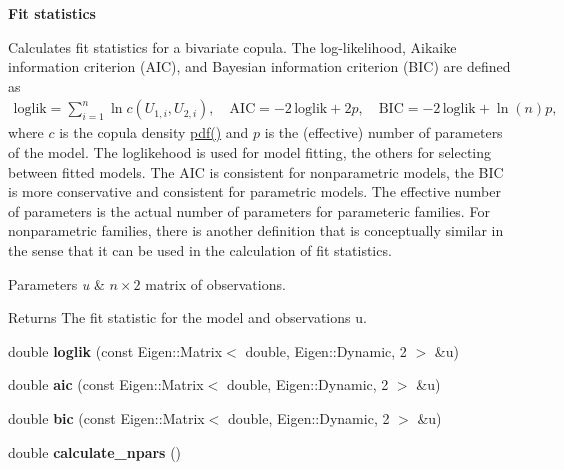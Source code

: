 \begin{Indent}{\bf Fit statistics}\par
{\em \label{classvinecopulib_1_1_bicop_fit_statistics}%
\hypertarget{classvinecopulib_1_1_bicop_fit_statistics}{}%


Calculates fit statistics for a bivariate copula. The log-\/likelihood, Aikaike information criterion (A\+IC), and Bayesian information criterion (B\+IC) are defined as \begin{align*} \mathrm{loglik} = \sum_{i = 1}^n \ln c(U_{1, i}, U_{2, i}), \quad \mathrm{AIC} = -2\, \mathrm{loglik} + 2 p, \quad \mathrm{BIC} = -2\, \mathrm{loglik} + \ln(n) p, \end{align*} where $ c $ is the copula density \hyperlink{classvinecopulib_1_1_bicop_a83dc7214e4bb1bfe59285ca05407d646}{pdf()} and $ p $ is the (effective) number of parameters of the model. The loglikehood is used for model fitting, the others for selecting between fitted models. The A\+IC is consistent for nonparametric models, the B\+IC is more conservative and consistent for parametric models. The effective number of parameters is the actual number of parameters for parameteric families. For nonparametric families, there is another definition that is conceptually similar in the sense that it can be used in the calculation of fit statistics.


\begin{DoxyParams}{Parameters}
{\em u} & $n \times 2$ matrix of observations. \\
\hline
\end{DoxyParams}
\begin{DoxyReturn}{Returns}
The fit statistic for the model and observations {\ttfamily u}. 
\end{DoxyReturn}
}\begin{DoxyCompactItemize}
\item 
double {\bfseries loglik} (const Eigen\+::\+Matrix$<$ double, Eigen\+::\+Dynamic, 2 $>$ \&u)\hypertarget{classvinecopulib_1_1_bicop_ae8bcc0c3265cc86565333a0cfd3d619d}{}\label{classvinecopulib_1_1_bicop_ae8bcc0c3265cc86565333a0cfd3d619d}

\item 
double {\bfseries aic} (const Eigen\+::\+Matrix$<$ double, Eigen\+::\+Dynamic, 2 $>$ \&u)\hypertarget{classvinecopulib_1_1_bicop_a9287fec95519fea64a2ae80f5888c709}{}\label{classvinecopulib_1_1_bicop_a9287fec95519fea64a2ae80f5888c709}

\item 
double {\bfseries bic} (const Eigen\+::\+Matrix$<$ double, Eigen\+::\+Dynamic, 2 $>$ \&u)\hypertarget{classvinecopulib_1_1_bicop_ac1f480d13b3464260c2dd6aa88b2e130}{}\label{classvinecopulib_1_1_bicop_ac1f480d13b3464260c2dd6aa88b2e130}

\item 
double {\bfseries calculate\+\_\+npars} ()\hypertarget{classvinecopulib_1_1_bicop_a9f3b3b83c54a9e1d809fdee058f3eb11}{}\label{classvinecopulib_1_1_bicop_a9f3b3b83c54a9e1d809fdee058f3eb11}

\end{DoxyCompactItemize}
\end{Indent}
